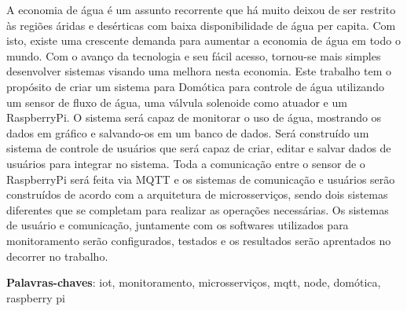 \documentclass[
	12pt,				%
	oneside,
	a4paper,			%
	english,			%
	brazil				%
	]{abntex2ufop} %
\begin{document}

\setlength{\absparsep}{18pt} %
\begin{resumo}
 \noindent
 A economia de água é um assunto recorrente que há muito deixou de ser restrito às regiões áridas e desérticas com baixa disponibilidade de água per capita. Com isto, existe uma crescente demanda para aumentar a economia de água em todo o mundo. Com o avanço da tecnologia e seu fácil acesso, tornou-se mais simples desenvolver sistemas visando uma melhora nesta economia. Este trabalho tem o propósito de criar um sistema para Domótica para controle de água utilizando um sensor de fluxo de água, uma válvula solenoide como atuador e um RaspberryPi. O sistema será capaz de monitorar o uso de água, mostrando os dados em gráfico e salvando-os em um banco de dados. Será construído um sistema de controle de usuários que será capaz de criar, editar e salvar dados de usuários para integrar no sistema. Toda a comunicação entre o sensor de o RaspberryPi será feita via MQTT e os sistemas de comunicação e usuários serão construídos de acordo com a arquitetura de microsserviços, sendo dois sistemas diferentes que se completam para realizar as operações necessárias. Os sistemas de usuário e comunicação, juntamente com os softwares utilizados para monitoramento serão configurados, testados e os resultados serão aprentados no decorrer no trabalho.

 \textbf{Palavras-chaves}: iot, monitoramento, microsserviços, mqtt, node, domótica, raspberry pi
\end{resumo}
\end{document}
